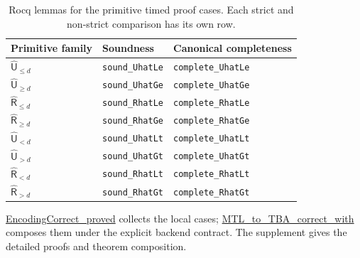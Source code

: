 \documentclass[10pt,journal,compsoc]{IEEEtran}
\newcommand{\hUntil}{\mathbin{\widehat{\mathsf{U}}}}
\newcommand{\hRelease}{\mathbin{\widehat{\mathsf{R}}}}
\newcommand{\Rocqid}[1]{{\small\url{#1}}}
\begin{document}
\begin{table}[t]
\centering
\caption{Rocq lemmas for the primitive timed proof cases. Each strict and
non-strict comparison has its own row.}
\label{tab:primitive-proof-lemmas}
\footnotesize
\begin{tabular}{@{}lll@{}}
\toprule
Primitive family & Soundness & Canonical completeness\\
\midrule
$\hUntil_{\le d}$ & \texttt{sound\_UhatLe} & \texttt{complete\_UhatLe}\\
$\hUntil_{\ge d}$ & \texttt{sound\_UhatGe} & \texttt{complete\_UhatGe}\\
$\hRelease_{\le d}$ & \texttt{sound\_RhatLe} & \texttt{complete\_RhatLe}\\
$\hRelease_{\ge d}$ & \texttt{sound\_RhatGe} & \texttt{complete\_RhatGe}\\
$\hUntil_{<d}$ & \texttt{sound\_UhatLt} & \texttt{complete\_UhatLt}\\
$\hUntil_{>d}$ & \texttt{sound\_UhatGt} & \texttt{complete\_UhatGt}\\
$\hRelease_{<d}$ & \texttt{sound\_RhatLt} & \texttt{complete\_RhatLt}\\
$\hRelease_{>d}$ & \texttt{sound\_RhatGt} & \texttt{complete\_RhatGt}\\
\bottomrule
\end{tabular}
\end{table}

\Rocqid{EncodingCorrect_proved} collects the local cases;
\Rocqid{MTL_to_TBA_correct_with} composes them under the explicit backend
contract. The supplement gives the detailed proofs and theorem composition.
\end{document}
